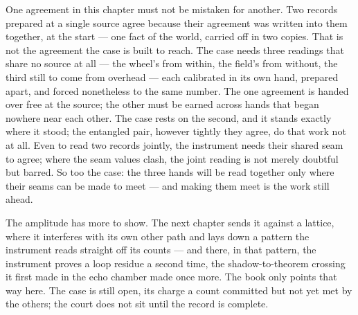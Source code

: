 One agreement in this chapter must not be mistaken for another. Two records prepared at a single source agree
because their agreement was written into them together, at the start --- one fact of the world, carried off in
two copies. That is not the agreement the case is built to reach. The case needs three readings that share no
source at all --- the wheel's from within, the field's from without, the third still to come from overhead ---
each calibrated in its own hand, prepared apart, and forced nonetheless to the same number. The one agreement is
handed over free at the source; the other must be earned across hands that began nowhere near each other. The
case rests on the second, and it stands exactly where it stood; the entangled pair, however tightly they agree,
do that work not at all. Even to read two records jointly, the instrument needs their shared seam to agree; where
the seam values clash, the joint reading is not merely doubtful but barred. So too the case: the three hands will
be read together only where their seams can be made to meet --- and making them meet is the work still ahead.

The amplitude has more to show. The next chapter sends it against a lattice, where it interferes with its own
other path and lays down a pattern the instrument reads straight off its counts --- and there, in that pattern,
the instrument proves a loop residue a second time, the shadow-to-theorem crossing it first made in the echo
chamber made once more. The book only points that way here. The case is still open, its charge a count committed
but not yet met by the others; the court does not sit until the record is complete.
